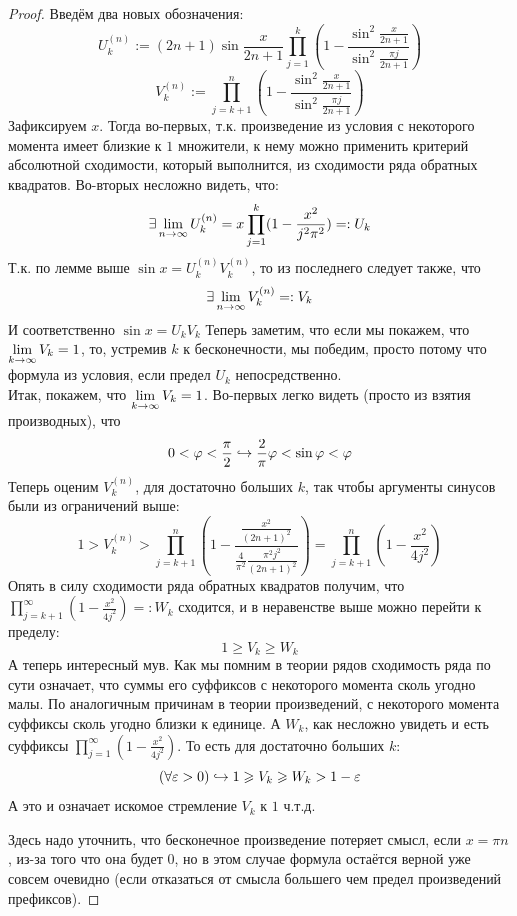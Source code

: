 \begin{proof}
	Введём два новых обозначения:
	\[
	U_k^{(n)} := (2n + 1)\sin{\frac{x}{2n+1}}\prod\limits_{j=1}^k (1 - \frac{\sin^2{\frac{x}{2n+1}}}{\sin^2{\frac{\pi j}{2n+1}}})
	\]
	\[
	V_k^{(n)} := \prod\limits_{j=k+1}^n (1 - \frac{\sin^2{\frac{x}{2n+1}}}{\sin^2{\frac{\pi j}{2n+1}}})
	\]
	Зафиксируем $x$. Тогда во-первых, т.к. произведение из условия с некоторого момента имеет близкие к $1$ множители, к нему можно применить критерий абсолютной сходимости, который выполнится, из сходимости ряда обратных квадратов. Во-вторых несложно видеть, что:
	\[
	\exists \lim\limits_{n\to\infty} U_k^{(n)}= x\prod\limits_{j=1}^k (1-\frac{x^2}{j^2\pi^2})=:U_k
	\]
	Т.к. по лемме выше $\sin{x} = U_k^{(n)} V_k^{(n)}$, то из последнего следует также, что
	\[
	\exists \lim\limits_{n\to\infty} V_k^{(n)}=:V_k
	\]
	И соответственно $\sin{x} = U_k V_k$
	Теперь заметим, что если мы покажем, что $\lim\limits_{k\to\infty} V_k = 1$, то, устремив $k$ к бесконечности, мы победим, просто потому что формула из условия, если предел $U_k$ непосредственно. 
	\\
	Итак, покажем, что $\lim\limits_{k\to\infty} V_k = 1$.
	Во-первых легко видеть (просто из взятия производных), что 
	\[
	0<\varphi<\frac{\pi}{2}\hookrightarrow \frac{2}{\pi}\varphi<\sin{\ensuremath{\varphi}}<\varphi
	\]
	Теперь оценим $V_k^{(n)}$, для достаточно больших $k$, так чтобы аргументы синусов были из ограничений выше:
	\[
	1 > V_k^{(n)} > \prod\limits_{j=k+1}^n (1 - \frac{\frac{x^2}{(2n+1)^2}}{\frac{4}{\pi^2}\frac{\pi^2 j^2}{(2n+1)^2}})= \prod\limits_{j=k+1}^n (1 - \frac{x^2}{4j^2})
	\]
	Опять в силу сходимости ряда обратных квадратов получим, что $\prod\limits_{j=k+1}^\infty (1 - \frac{x^2}{4j^2}) =: W_k$ сходится, и в неравенстве выше можно перейти к пределу: 
	\[
	1\ge V_k\ge W_k
	\]
	А теперь интересный мув. Как мы помним в теории рядов сходимость ряда по сути означает, что суммы его суффиксов с некоторого момента сколь угодно малы. По аналогичным причинам в теории произведений, с некоторого момента суффиксы сколь угодно близки к единице. А $W_k$, как несложно увидеть и есть суффиксы $\prod\limits_{j=1}^\infty (1 - \frac{x^2}{4j^2})$. То есть для достаточно больших $k$:
	\[
	(\forall \varepsilon > 0)\hookrightarrow 1 \geqslant V_k \geqslant W_k > 1 - \varepsilon
	\]
	А это и означает искомое стремление $V_k$ к $1$ ч.т.д.
	
	Здесь надо уточнить, что бесконечное произведение потеряет смысл, если $x = \pi n$, из-за того что она будет 0, но в этом случае формула остаётся верной уже совсем очевидно (если отказаться от смысла большего чем предел произведений префиксов).
\end{proof}

